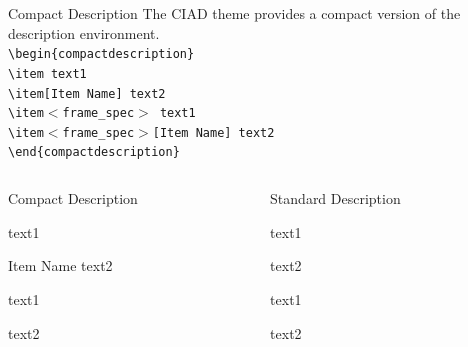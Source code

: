 \documentclass[english,sectioncirclenumberstyle]{ciadbeamer}
\begin{document}
\begin{frame}{Compact Description}
	The CIAD theme provides a compact version of the description environment. \\[.5cm]
	{\smaller
	\texttt{{\textbackslash}begin\{compactdescription\}} \\
	\texttt{{\textbackslash}item text1} \\
	\texttt{{\textbackslash}item[Item Name] text2} \\
	\texttt{{\textbackslash}item$<$frame\_spec$>$ text1} \\
	\texttt{{\textbackslash}item$<$frame\_spec$>$[Item Name] text2} \\
	\texttt{{\textbackslash}end\{compactdescription\}}} \\[.5cm]
	\begin{columns}
		\begin{column}{.5\linewidth}
			\begin{block}{Compact Description}
				\begin{compactdescription}
				\item text1
				\item[Item Name] text2
				\item<2> text1
				\item<2>[Item Name] text2
				\end{compactdescription}
			\end{block}
		\end{column}
		\begin{column}{.5\linewidth}
			\begin{block}{Standard Description}
				\begin{description}
				\item text1
				\item[Item Name] text2
				\item<2> text1
				\item<2>[Item Name] text2
				\end{description}
			\end{block}
		\end{column}
	\end{columns}
\end{frame}
\end{document}
